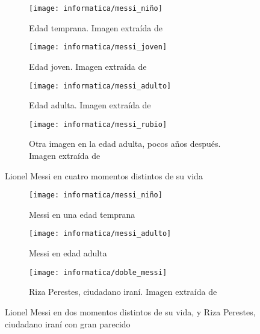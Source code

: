 \begin{figure}[H]
	\centering
	\begin{subfigure}{0.5\textwidth}
		\centering
		\texttt{[image: informatica/messi\_niño]}
		\caption{Edad temprana. Imagen extraída de \cite{informatica:webimg_messi_pequeno}}
		\label{img:messi_pequeno}
	\end{subfigure}%
	\begin{subfigure}{.5\textwidth}
		\centering
		\texttt{[image: informatica/messi\_joven]}
		\caption{Edad joven. Imagen extraída de \cite{informatica:webimg_messi_joven}}
	\end{subfigure}%

	\begin{subfigure}{.5\textwidth}
		\centering
		\texttt{[image: informatica/messi\_adulto]}
		\caption{Edad adulta. Imagen extraída de \cite{informatica:webimg_messi_adulto}}
		\label{img:messi_adulto}
	\end{subfigure}%
	\begin{subfigure}{.5\textwidth}
		\centering
		\texttt{[image: informatica/messi\_rubio]}
		\caption{Otra imagen en la edad adulta, pocos años después. Imagen extraída de \cite{informatica:webimg_messi_rubio}}
	\end{subfigure}

	\caption{Lionel Messi en cuatro momentos distintos de su vida}
	\label{img:messi_cuatro_edades}

\end{figure}

\begin{figure}[hbtp]
	\centering
	\begin{subfigure}{0.5\textwidth}
		\centering
		\texttt{[image: informatica/messi\_niño]}
		\caption{Messi en una edad temprana}
	\end{subfigure}%
	\begin{subfigure}{.5\textwidth}
		\centering
		\texttt{[image: informatica/messi\_adulto]}
		\caption{Messi en edad adulta}
	\end{subfigure}

	\begin{subfigure}{.8\textwidth}
		\centering
		\texttt{[image: informatica/doble\_messi]}
		\caption{Riza Perestes, ciudadano iraní. Imagen extraída de \cite{informatica:imitador_messi}}
	\end{subfigure}

	\caption{Lionel Messi en dos momentos distintos de su vida, y Riza Perestes, ciudadano iraní con gran parecido}
	\label{img:messi_distintos_otro_adulto}
\end{figure}

